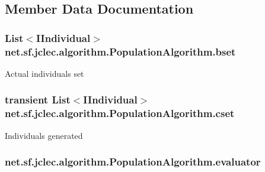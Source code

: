 \subsection{Member Data Documentation}
\hypertarget{classnet_1_1sf_1_1jclec_1_1algorithm_1_1_population_algorithm_a21d6795af96a1b53490d9395afa6e731}{
\subsubsection[{bset}]{\setlength{\rightskip}{0pt plus 5cm}List$<${\bf I\-Individual}$>$ net.\-sf.\-jclec.\-algorithm.\-Population\-Algorithm.\-bset\hspace{0.3cm}{\ttfamily [protected]}}}\label{classnet_1_1sf_1_1jclec_1_1algorithm_1_1_population_algorithm_a21d6795af96a1b53490d9395afa6e731}
Actual individuals set \hypertarget{classnet_1_1sf_1_1jclec_1_1algorithm_1_1_population_algorithm_a5d939a8aba3858f4f2a32870f5f60edb}{
\subsubsection[{cset}]{\setlength{\rightskip}{0pt plus 5cm}transient List$<${\bf I\-Individual}$>$ net.\-sf.\-jclec.\-algorithm.\-Population\-Algorithm.\-cset\hspace{0.3cm}{\ttfamily [protected]}}}\label{classnet_1_1sf_1_1jclec_1_1algorithm_1_1_population_algorithm_a5d939a8aba3858f4f2a32870f5f60edb}
Individuals generated \hypertarget{classnet_1_1sf_1_1jclec_1_1algorithm_1_1_population_algorithm_a9f6c1c4e616e67830292a672907be134}{
\subsubsection[{evaluator}]{ net.\-sf.\-jclec.\-algorithm.\-Population\-Algorithm.\-evaluator\hspace{0.3cm}{\ttfamily [protected]}}}\label{classnet_1_1sf_1_1jclec_1_1algorithm_1_1_population_algorithm_a9f6c1c4e616e67830292a672907be134}
